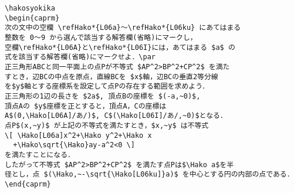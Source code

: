 \begin{verbatim}
\hakosyokika
\begin{caprm}
次の文中の空欄 \refHako*{L06a}〜\refHako*{L06ku} にあてはまる
整数を 0〜9 から選んで該当する解答欄(省略)にマークし，
空欄\refHako*{L06A}と\refHako*{L06I}には，あてはまる $a$ の
式を該当する解答欄(省略)にマークせよ．\par
正三角形ABCと同一平面上の点Pが不等式 $AP^2>BP^2+CP^2$ を満た
すとき，辺BCの中点を原点，直線BCを $x$軸，辺BCの垂直2等分線
を$y$軸とする座標系を設定して点Pの存在する範囲を求めよう．
正三角形の1辺の長さを $2a$, 頂点Bの座標を $(-a,~0)$, 
頂点Aの $y$座標を正とすると，頂点A，Cの座標は 
A$(0,\Hako[L06A]/あ/)$, C$(\Hako[L06I]/あ/,~0)$となる．
点P$(x,~y)$ が上記の不等式を満たすとき，$x,~y$ は不等式
\[ \Hako[L06a]x^2+\Hako y^2+\Hako x
  +\Hako\sqrt{\Hako}ay-a^2<0 \]
を満たすことになる．
したがって不等式 $AP^2>BP^2+CP^2$ を満たす点Pは$\Hako a$を半
径とし，点 $(\Hako,~-\sqrt{\Hako[L06ku]}a)$ を中心とする円の内部の点である．
\end{caprm}
\end{verbatim}

